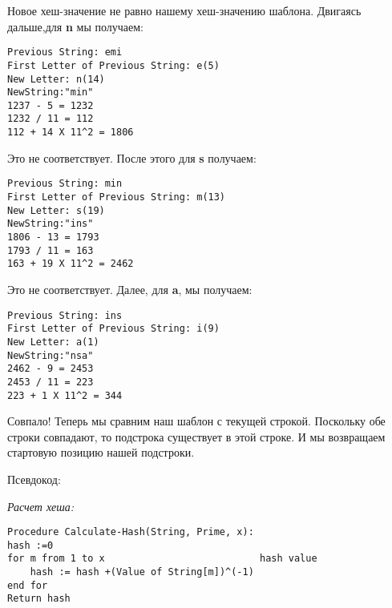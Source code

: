 Новое хеш-значение не равно нашему хеш-значению шаблона. Двигаясь дальше,для \textbf{n} мы
получаем:
\vspace{\baselineskip}
\begin{tcolorbox}
\begin{verbatim}
Previous String: emi
First Letter of Previous String: e(5)
New Letter: n(14)
NewString:"min"
1237 - 5 = 1232
1232 / 11 = 112
112 + 14 X 11^2 = 1806
\end{verbatim}
\end{tcolorbox}
\vspace{\baselineskip}
Это не соответствует. После этого для \textbf{s} получаем:
\vspace{\baselineskip}
\begin{tcolorbox}
\begin{verbatim}
Previous String: min
First Letter of Previous String: m(13)
New Letter: s(19)
NewString:"ins"
1806 - 13 = 1793
1793 / 11 = 163
163 + 19 X 11^2 = 2462
\end{verbatim}
\end{tcolorbox}
\vspace{\baselineskip}
Это не соответствует. Далее, для \textbf{a}, мы получаем:
\vspace{\baselineskip}
\begin{tcolorbox}
\begin{verbatim}
Previous String: ins
First Letter of Previous String: i(9)
New Letter: a(1)
NewString:"nsa"
2462 - 9 = 2453
2453 / 11 = 223
223 + 1 X 11^2 = 344
\end{verbatim}
\end{tcolorbox}
\vspace{\baselineskip}
Совпало! Теперь мы сравним наш шаблон с текущей строкой. Поскольку обе строки
совпадают, то подстрока существует в этой строке. И мы возвращаем стартовую позицию
нашей подстроки.
\vspace{\baselineskip}

Псевдокод:
\vspace{\baselineskip}

\textit{Расчет хеша:}
\vspace{\baselineskip}
\begin{tcolorbox}
\begin{verbatim}
Procedure Calculate-Hash(String, Prime, x):
hash :=0        
for m from 1 to x                           hash value
    hash := hash +(Value of String[m])^(-1)
end for
Return hash
\end{verbatim}
\end{tcolorbox}
\vspace{\baselineskip}

